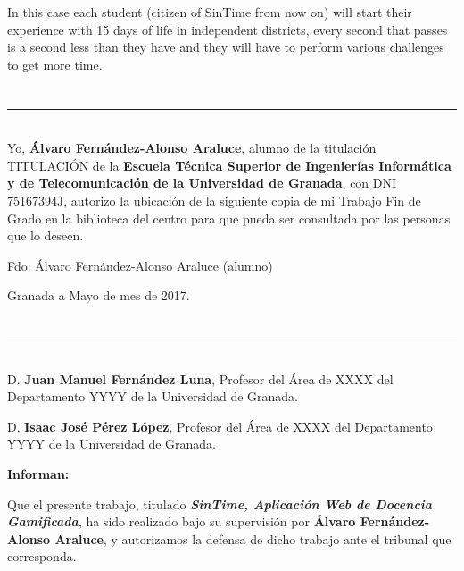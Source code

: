 In this case each student (citizen of SinTime from now on) will start their experience with 15 days of life in independent districts, every second that passes is a second less than they have and they will have to perform various challenges to get more time.

\chapter*{}
\thispagestyle{empty}

\noindent\rule[-1ex]{\textwidth}{2pt}\\[4.5ex]

Yo, \textbf{Álvaro Fernández-Alonso Araluce}, alumno de la titulación TITULACIÓN de la \textbf{Escuela Técnica Superior
de Ingenierías Informática y de Telecomunicación de la Universidad de Granada}, con DNI 75167394J, autorizo la
ubicación de la siguiente copia de mi Trabajo Fin de Grado en la biblioteca del centro para que pueda ser
consultada por las personas que lo deseen.

\vspace{6cm}

\noindent Fdo: Álvaro Fernández-Alonso Araluce (alumno)

\vspace{2cm}

\begin{flushright}
Granada a Mayo de mes de 2017.
\end{flushright}


\chapter*{}
\thispagestyle{empty}

\noindent\rule[-1ex]{\textwidth}{2pt}\\[4.5ex]

D. \textbf{Juan Manuel Fernández Luna}, Profesor del Área de XXXX del Departamento YYYY de la Universidad de Granada.

\vspace{0.5cm}

D. \textbf{Isaac José Pérez López}, Profesor del Área de XXXX del Departamento YYYY de la Universidad de Granada.


\vspace{0.5cm}

\textbf{Informan:}

\vspace{0.5cm}

Que el presente trabajo, titulado \textit{\textbf{SinTime, Aplicación Web de Docencia Gamificada}},
ha sido realizado bajo su supervisión por \textbf{Álvaro Fernández-Alonso Araluce}, y autorizamos la defensa de dicho trabajo ante el tribunal
que corresponda.

